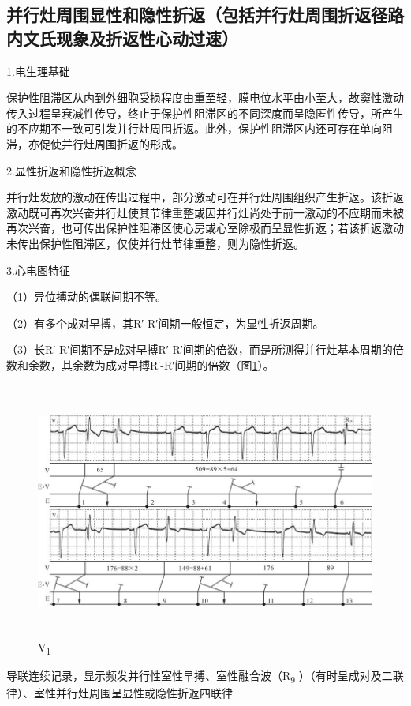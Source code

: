 \protect\hypertarget{text00023.htmlux5cux23subid291}{}{}

\subsection{并行灶周围显性和隐性折返（包括并行灶周围折返径路内文氏现象及折返性心动过速）}

1.电生理基础

保护性阻滞区从内到外细胞受损程度由重至轻，膜电位水平由小至大，故窦性激动传入过程呈衰减性传导，终止于保护性阻滞区的不同深度而呈隐匿性传导，所产生的不应期不一致可引发并行灶周围折返。此外，保护性阻滞区内还可存在单向阻滞，亦促使并行灶周围折返的形成。

2.显性折返和隐性折返概念

并行灶发放的激动在传出过程中，部分激动可在并行灶周围组织产生折返。该折返激动既可再次兴奋并行灶使其节律重整或因并行灶尚处于前一激动的不应期而未被再次兴奋，也可传出保护性阻滞区使心房或心室除极而呈显性折返；若该折返激动未传出保护性阻滞区，仅使并行灶节律重整，则为隐性折返。

3.心电图特征

（1）异位搏动的偶联间期不等。

（2）有多个成对早搏，其R′-R′间期一般恒定，为显性折返周期。

（3）长R′-R′间期不是成对早搏R′-R′间期的倍数，而是所测得并行灶基本周期的倍数和余数，其余数为成对早搏R′-R′间期的倍数（图\ref{fig16-15}）。

\begin{figure}[!htbp]
 \centering
 \includegraphics[width=5.8125in,height=3.32292in]{./images/Image00291.jpg}
 \captionsetup{justification=centering}
 \caption{V\textsubscript{1}}
 \label{fig16-15}
  \end{figure} 
导联连续记录，显示频发并行性室性早搏、室性融合波（R\textsubscript{9}
）（有时呈成对及二联律）、室性并行灶周围呈显性或隐性折返四联律

